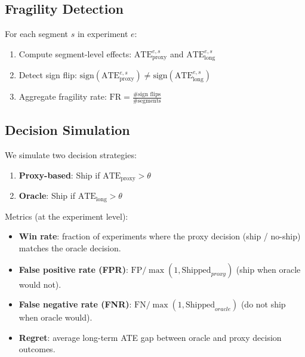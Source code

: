 \documentclass[11pt,twocolumn]{article}
\begin{document}
\subsection{Fragility Detection}

For each segment $s$ in experiment $e$:

\begin{enumerate}
    \item Compute segment-level effects: $\text{ATE}_{\text{proxy}}^{e,s}$ and $\text{ATE}_{\text{long}}^{e,s}$
    \item Detect sign flip: $\text{sign}(\text{ATE}_{\text{proxy}}^{e,s}) \neq \text{sign}(\text{ATE}_{\text{long}}^{e,s})$
    \item Aggregate fragility rate: $\text{FR} = \frac{\text{\# sign flips}}{\text{\# segments}}$
\end{enumerate}

\subsection{Decision Simulation}

We simulate two decision strategies:

\begin{enumerate}
    \item \textbf{Proxy-based}: Ship if $\text{ATE}_{\text{proxy}} > \theta$
    \item \textbf{Oracle}: Ship if $\text{ATE}_{\text{long}} > \theta$
\end{enumerate}

Metrics (at the experiment level):
\begin{itemize}
    \item \textbf{Win rate}: fraction of experiments where the proxy decision (ship / no-ship) matches the oracle decision.
    \item \textbf{False positive rate (FPR)}: $\mathrm{FP} / \max(1,\mathrm{Shipped}_{proxy})$ (ship when oracle would not).
    \item \textbf{False negative rate (FNR)}: $\mathrm{FN} / \max(1,\mathrm{Shipped}_{oracle})$ (do not ship when oracle would).
    \item \textbf{Regret}: average long-term ATE gap between oracle and proxy decision outcomes.
\end{itemize}
\end{document}
